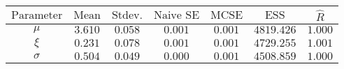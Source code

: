 \begin{tabular}{ccccccc}
\toprule
$\textrm{Parameter}$ & $\textrm{Mean}$ & $\textrm{Stdev.}$ & $\textrm{Naive SE}$ & $\textrm{MCSE}$ & $\textrm{ESS}$ & $\hat{R}$\\
\midrule
$\mu$ & $3.610$ & $0.058$ & $0.001$ & $0.001$ & $4819.426$ & $1.000$\\
$\xi$ & $0.231$ & $0.078$ & $0.001$ & $0.001$ & $4729.255$ & $1.001$\\
$\sigma$ & $0.504$ & $0.049$ & $0.000$ & $0.001$ & $4508.859$ & $1.000$\\
\bottomrule
\end{tabular}
